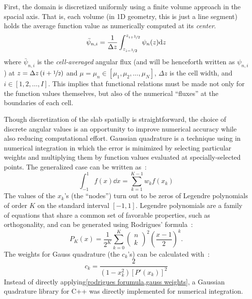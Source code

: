 \documentclass{NE515}
\theoremstyle{definition}
\begin{document}
    First, the domain is discretized uniformly using a finite volume approach in the spacial axis.
    That is, each volume (in 1D geometry, this is just a line segment) holds the average function value as numerically computed at its \textit{center}.
    \begin{equation}
        \bar{\psi}_{n,i}=\frac{1}{\Delta z}\int_{z_{i-\nicefrac{1}{2}}}^{z_{i+\nicefrac{1}{2}}} \psi_n(z)\dd z
    \end{equation}
    where $\bar{\psi}_{n,i}$ is the \textit{cell-averaged} angular flux (and will be henceforth written as $\psi_{n,i}$) at $z=\Delta z\left( i+\nicefrac{1}{2}\right)$ and $\mu=\mu_n\in[\mu_1,\mu_2,\ldots,\mu_N]$, $\Delta z$ is the cell width, and $i\in[1,2,\ldots,I]$.
    This implies that functional relations must be made not only for the function values themselves, but also of the numerical ``fluxes'' at the boundaries of each cell.

    Though discretization of the slab spatially is straightforward, the choice of discrete angular values is an opportunity to improve numerical accuracy while also reducing computational effort.
    Gaussian quadrature is a technique using in numerical integration in which the error is minimized by selecting particular weights and multiplying them by function values evaluated at specially-selected points.
    The generalized case can be written as~\cite{gezerlisNumericalMethodsPhysicsa}:
    \begin{equation}
        \int_{-1}^{1} f(x) \dd x = \sum_{k=1}^{K-1} w_k f(x_k)
    \end{equation}
    The values of the $x_k$'s (the ``nodes'') turn out to be zeros of Legendre polynomials of order $K$ on the standard interval $[-1,1]$.
    Legendre polynomials are a family of equations that share a common set of favorable properties, such as orthogonality, and can be generated using Rodrigues' formula~\cite{LegendrePolynomials2024}:
    \begin{equation}
        \label{rodrigues forumula}
        P_K (x)= \frac{1}{2^K} \sum_{k=0}^{K}
        \begin{pmatrix}
            n \\
            k
        \end{pmatrix}^2
        \left( \frac{x-1}{2} \right)^k.
    \end{equation}
    The weights for Gauss quadrature (the $c_k$'s) can be calculated with~\cite{gezerlisNumericalMethodsPhysicsa}:
    \begin{equation}
        \label{gauss weights}
        c_k=\frac{2}{\left( 1-x_k^2 \right)\left[ P' (x_k) \right]^2}
    \end{equation}
    Instead of directly applying\cref{rodrigues forumula,gauss weights}, a Gaussian quadrature library for C++ was directly implemented for numerical integration.
\end{document}
